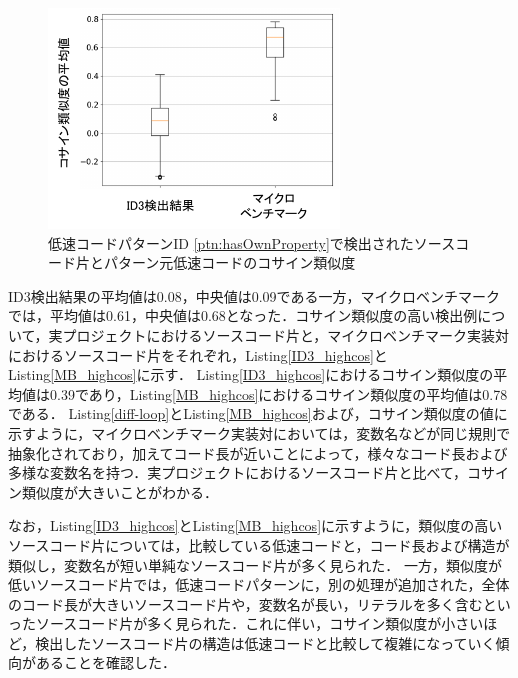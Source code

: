 \documentclass[submit,techrep,noauthor]{ipsj}
\begin{document}
\begin{figure}[t]
    \centering
    \includegraphics[width=0.85\linewidth]{./Noguchi_fig/boxplot_compare.pdf}
    \caption{低速コードパターンID \ref{ptn:hasOwnProperty}で検出されたソースコード片とパターン元低速コードのコサイン類似度}
    \label{fig:boxplot_cosine}
\end{figure}

ID3検出結果の平均値は0.08，中央値は0.09である一方，マイクロベンチマークでは，平均値は0.61，中央値は0.68となった．コサイン類似度の高い検出例について，実プロジェクトにおけるソースコード片と，マイクロベンチマーク実装対におけるソースコード片をそれぞれ，Listing\ref{ID3_highcos}とListing\ref{MB_highcos}に示す．
Listing\ref{ID3_highcos}におけるコサイン類似度の平均値は0.39であり，Listing\ref{MB_highcos}におけるコサイン類似度の平均値は0.78である．
Listing\ref{diff-loop}とListing\ref{MB_highcos}および，コサイン類似度の値に示すように，マイクロベンチマーク実装対においては，変数名などが同じ規則で抽象化されており，加えてコード長が近いことによって，様々なコード長および多様な変数名を持つ．実プロジェクトにおけるソースコード片と比べて，コサイン類似度が大きいことがわかる．

なお，Listing\ref{ID3_highcos}とListing\ref{MB_highcos}に示すように，類似度の高いソースコード片については，比較している低速コードと，コード長および構造が類似し，変数名が短い単純なソースコード片が多く見られた．
一方，類似度が低いソースコード片では，低速コードパターンに，別の処理が追加された，全体のコード長が大きいソースコード片や，変数名が長い，リテラルを多く含むといったソースコード片が多く見られた．これに伴い，コサイン類似度が小さいほど，検出したソースコード片の構造は低速コードと比較して複雑になっていく傾向があることを確認した．
\end{document}
